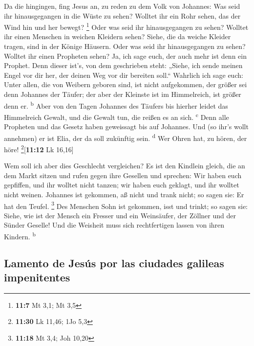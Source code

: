  Da die hingingen, fing Jesus an, zu reden zu dem Volk von
Johannes: Was seid ihr hinausgegangen in die Wüste zu sehen? Wolltet ihr
ein Rohr sehen, das der Wind hin und her bewegt? \footnote{\textbf{11:7}
  Mt 3,1; Mt 3,5}  Oder was seid ihr hinausgegangen zu
sehen? Wolltet ihr einen Menschen in weichen Kleidern sehen? Siehe, die
da weiche Kleider tragen, sind in der Könige Häusern. 
Oder was seid ihr hinausgegangen zu sehen? Wolltet ihr einen Propheten
sehen? Ja, ich sage euch, der auch mehr ist denn ein Prophet.
 Denn dieser ist's, von dem geschrieben steht: „Siehe,
ich sende meinen Engel vor dir her, der deinen Weg vor dir bereiten
soll.``  Wahrlich ich sage euch: Unter allen, die von
Weibern geboren sind, ist nicht aufgekommen, der größer sei denn
Johannes der Täufer; der aber der Kleinste ist im Himmelreich, ist
größer denn er. \textsuperscript{b}  Aber von den Tagen
Johannes des Täufers bis hierher leidet das Himmelreich Gewalt, und die
Gewalt tun, die reißen es an sich. \textsuperscript{c} 
Denn alle Propheten und das Gesetz haben geweissagt bis auf Johannes.
 Und (so ihr's wollt annehmen) er ist Elia, der da soll
zukünftig sein. \textsuperscript{d}  Wer Ohren hat, zu
hören, der höre! \footnote{\textbf{11:30} Lk 11,46; 1Jo 5,3}{[}\textbf{11:12}
Lk 16,16{]}

 Wem soll ich aber dies Geschlecht vergleichen? Es ist
den Kindlein gleich, die an dem Markt sitzen und rufen gegen ihre
Gesellen  und sprechen: Wir haben euch gepfiffen, und ihr
wolltet nicht tanzen; wir haben euch geklagt, und ihr wolltet nicht
weinen.  Johannes ist gekommen, aß nicht und trank nicht;
so sagen sie: Er hat den Teufel. \footnote{\textbf{11:18} Mt 3,4; Joh
  10,20}  Des Menschen Sohn ist gekommen, isst und
trinkt; so sagen sie: Siehe, wie ist der Mensch ein Fresser und ein
Weinsäufer, der Zöllner und der Sünder Geselle! Und die Weisheit muss
sich rechtfertigen lassen von ihren Kindern. \textsuperscript{b}

\hypertarget{lamento-de-jesuxfas-por-las-ciudades-galileas-impenitentes}{%
\subsection{Lamento de Jesús por las ciudades galileas
impenitentes}\label{lamento-de-jesuxfas-por-las-ciudades-galileas-impenitentes}}

